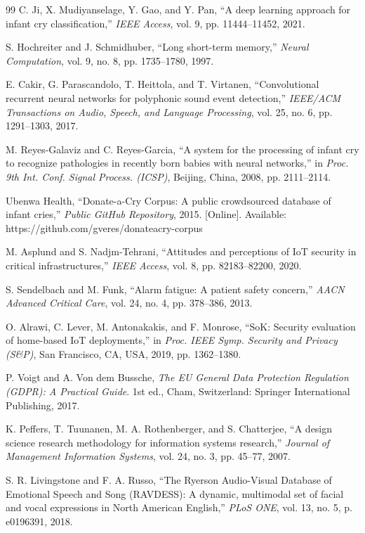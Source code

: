 \documentclass[12pt, a4paper]{report}
\begin{document}
\begin{thebibliography}{99}
C. Ji, X. Mudiyanselage, Y. Gao, and Y. Pan, ``A deep learning approach for infant cry classification,'' \textit{IEEE Access}, vol. 9, pp. 11444--11452, 2021.

S. Hochreiter and J. Schmidhuber, ``Long short-term memory,'' \textit{Neural Computation}, vol. 9, no. 8, pp. 1735--1780, 1997.

E. Cakir, G. Parascandolo, T. Heittola, and T. Virtanen, ``Convolutional recurrent neural networks for polyphonic sound event detection,'' \textit{IEEE/ACM Transactions on Audio, Speech, and Language Processing}, vol. 25, no. 6, pp. 1291--1303, 2017.

M. Reyes-Galaviz and C. Reyes-Garcia, ``A system for the processing of infant cry to recognize pathologies in recently born babies with neural networks,'' in \textit{Proc. 9th Int. Conf. Signal Process. (ICSP)}, Beijing, China, 2008, pp. 2111--2114.

Ubenwa Health, ``Donate-a-Cry Corpus: A public crowdsourced database of infant cries,'' \textit{Public GitHub Repository}, 2015. [Online]. Available: https://github.com/gveres/donateacry-corpus

M. Asplund and S. Nadjm-Tehrani, ``Attitudes and perceptions of IoT security in critical infrastructures,'' \textit{IEEE Access}, vol. 8, pp. 82183--82200, 2020.

S. Sendelbach and M. Funk, ``Alarm fatigue: A patient safety concern,'' \textit{AACN Advanced Critical Care}, vol. 24, no. 4, pp. 378--386, 2013.

O. Alrawi, C. Lever, M. Antonakakis, and F. Monrose, ``SoK: Security evaluation of home-based IoT deployments,'' in \textit{Proc. IEEE Symp. Security and Privacy (S\&P)}, San Francisco, CA, USA, 2019, pp. 1362--1380.

P. Voigt and A. Von dem Bussche, \textit{The EU General Data Protection Regulation (GDPR): A Practical Guide}. 1st ed., Cham, Switzerland: Springer International Publishing, 2017.

K. Peffers, T. Tuunanen, M. A. Rothenberger, and S. Chatterjee, ``A design science research methodology for information systems research,'' \textit{Journal of Management Information Systems}, vol. 24, no. 3, pp. 45--77, 2007.

S. R. Livingstone and F. A. Russo, ``The Ryerson Audio-Visual Database of Emotional Speech and Song (RAVDESS): A dynamic, multimodal set of facial and vocal expressions in North American English,'' \textit{PLoS ONE}, vol. 13, no. 5, p. e0196391, 2018.


\end{thebibliography}
\end{document}

